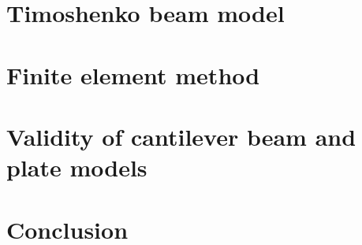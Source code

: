 \documentclass[12pt]{report}
\begin{document}
\chapter{Timoshenko beam model}\label{ch:timoshenko-beam-model}




% 



\chapter{Finite element method}\label{ch:finite-element-method}




\chapter{Validity of cantilever beam and plate models}\label{ch:validity-of-cantilever-beam-and-plate-models}

% 



\chapter{Conclusion}\label{ch:conclusion}




\printbibliography[heading=bibintoc]
\end{document}
